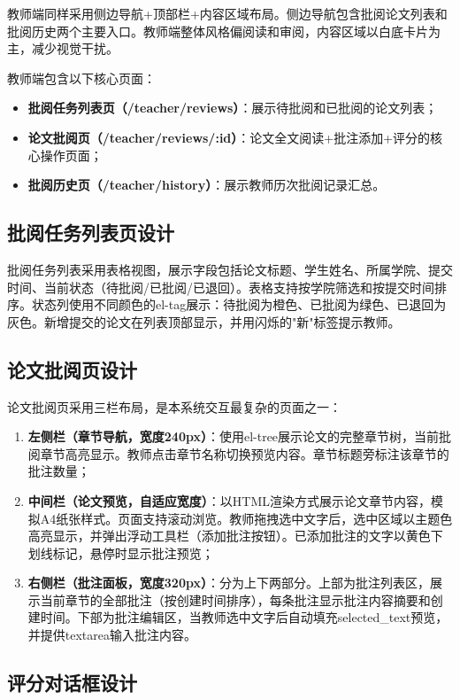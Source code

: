 \documentclass{../../softeng}
\begin{document}
教师端同样采用侧边导航+顶部栏+内容区域布局。侧边导航包含批阅论文列表和批阅历史两个主要入口。教师端整体风格偏阅读和审阅，内容区域以白底卡片为主，减少视觉干扰。

教师端包含以下核心页面：
\begin{itemize}
    \item \textbf{批阅任务列表页（/teacher/reviews）}：展示待批阅和已批阅的论文列表；
    \item \textbf{论文批阅页（/teacher/reviews/:id）}：论文全文阅读+批注添加+评分的核心操作页面；
    \item \textbf{批阅历史页（/teacher/history）}：展示教师历次批阅记录汇总。
\end{itemize}

\subsection{批阅任务列表页设计}

批阅任务列表采用表格视图，展示字段包括论文标题、学生姓名、所属学院、提交时间、当前状态（待批阅/已批阅/已退回）。表格支持按学院筛选和按提交时间排序。状态列使用不同颜色的el-tag展示：待批阅为橙色、已批阅为绿色、已退回为灰色。新增提交的论文在列表顶部显示，并用闪烁的"新"标签提示教师。

\subsection{论文批阅页设计}

论文批阅页采用三栏布局，是本系统交互最复杂的页面之一：
\begin{enumerate}
    \item \textbf{左侧栏（章节导航，宽度240px）}：使用el-tree展示论文的完整章节树，当前批阅章节高亮显示。教师点击章节名称切换预览内容。章节标题旁标注该章节的批注数量；
    \item \textbf{中间栏（论文预览，自适应宽度）}：以HTML渲染方式展示论文章节内容，模拟A4纸张样式。页面支持滚动浏览。教师拖拽选中文字后，选中区域以主题色高亮显示，并弹出浮动工具栏（添加批注按钮）。已添加批注的文字以黄色下划线标记，悬停时显示批注预览；
    \item \textbf{右侧栏（批注面板，宽度320px）}：分为上下两部分。上部为批注列表区，展示当前章节的全部批注（按创建时间排序），每条批注显示批注内容摘要和创建时间。下部为批注编辑区，当教师选中文字后自动填充selected\_text预览，并提供textarea输入批注内容。
\end{enumerate}

\subsection{评分对话框设计}
\end{document}
